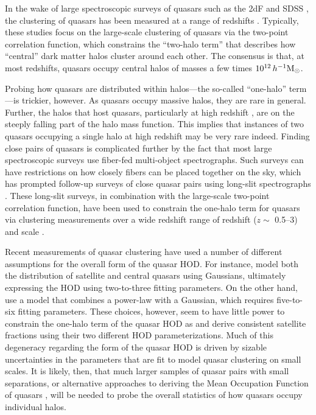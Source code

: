 \documentclass[useAMS,usenatbib]{mn2e}
\begin{document}
In the wake of large spectroscopic surveys of quasars such as the 2dF \citep[][]{2dFsurv} and SDSS 
\citep[e.g.,][]{fu96,gu98,yo00,va01,st02,str02,te04,we04,yi04a,yi04b,bo04,ro05,wi05}, the clustering of quasars has been measured at a range of redshifts
\citep[e.g.,][]{cr04,po04,my06,my07,my07b,she07,she09a,ro09,ric12,wh12,ric13,ro13,ef15,la17}.
Typically, these studies focus on the large-scale clustering of quasars via the two-point correlation function, which 
constrains the ``two-halo term'' that describes how ``central'' dark matter halos cluster around each other. The consensus is that, 
at most redshifts, quasars occupy central halos of masses a few times $10^{12}\,h^{-1} {\rm M_{\odot}}$. 

Probing how quasars are distributed within halos---the so-called ``one-halo'' term---is trickier, however. As 
quasars occupy massive halos, they are rare in general. Further, the halos that host quasars, particularly at 
high redshift \citep[e.g.,][]{wh12,ef15}, are on the steeply falling part of the halo mass function.%
This implies that instances of two quasars occupying a single halo at high redshift may be very rare indeed. 
Finding close pairs of quasars is complicated further by the fact that most large spectroscopic surveys use 
fiber-fed multi-object spectrographs. Such surveys can have restrictions on how closely fibers can be placed 
together on the sky, which has prompted follow-up surveys of close quasar pairs using long-slit spectrographs 
\citep[e.g.,][]{Hen06,my08,Hen10,ko12,ef17}. These long-slit surveys, in combination with the large-scale two-point
correlation function, have been used to constrain the one-halo term for quasars via clustering measurements over 
a wide redshift range of redshift ($z \sim$ 0.5--3) and scale \citep[][]{ric12,ko12,sh13}.

Recent measurements of quasar clustering have used a number of different assumptions for the overall form
of the quasar HOD. For instance, \citet{ko12} model both the distribution of satellite and
central quasars using Gaussians, ultimately expressing the HOD using two-to-three fitting  
parameters. On the other hand, \citet{zh07,ric12,ric13,sh13} use a model that combines a power-law with
a Gaussian, which requires five-to-six fitting parameters. These choices, however, seem to have little
power to constrain the one-halo term of the quasar HOD as \citep{ko12} and \citep{sh13} derive consistent 
satellite fractions using their two different HOD parameterizations. Much of this degeneracy regarding the form of the quasar 
HOD is driven by sizable uncertainties in the parameters that are fit to model quasar clustering on small scales. It is likely, 
then, that much larger samples of quasar pairs with small separations, or alternative approaches to deriving the 
Mean Occupation Function of quasars \citep[e.g][]{Cha13}, will be needed to probe the overall statistics of how
quasars occupy individual halos.
\end{document}
